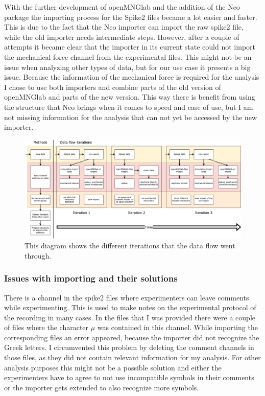 With the further development of openMNGlab and the addition of the Neo package the importing process for the Spike2 files became a lot easier and faster. This is due to the fact that the Neo importer can import the raw spike2 file, while the old importer needs intermediate steps. However, after a couple of attempts it became clear that the importer in its current state could not import the mechanical force channel from the experimental files. This might not be an issue when analyzing other types of data, but for our use case it presents a big issue. Because the information of the mechanical force is required for the analysis I chose to use both importers and combine parts of the old version of openMNGlab and parts of the new version. This way there is benefit from using the structure that Neo brings when it comes to speed and ease of use, but I am not missing information for the analysis that can not yet be accessed by the new importer.


\begin{figure}
	\includegraphics[width = \textwidth]{src/pic/Data_flow_iteration}
	\caption{This diagram shows the different iterations that the data flow went through.}
	\label{fig:eventplot}
\end{figure}

\subsubsection{Issues with importing and their solutions}
There is a channel in the spike2 files where experimenters can leave comments while experimenting. This is used to make notes on the experimental protocol of the recording in many cases. In the files that I was provided there were a couple of files where the character $\mu$ was contained in this channel. While importing the corresponding files an error appeared, because the importer did not recognize the Greek letters. I circumvented this problem by deleting the comment channels in those files, as they did not contain relevant information for my analysis. For other analysis purposes this might not be a possible solution and either the experimenters have to agree to not use incompatible symbols in their comments or the importer gets extended to also recognize more symbols.




